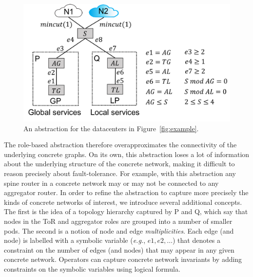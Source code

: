 \documentclass[numbers, 10pt, preprint]{sigplanconf}
\newcommand{\EG}{\emph{e.g.}}
\begin{document}
\begin{figure}[t!]
  \centering
  \includegraphics[width=\columnwidth]{figures/example3}
  \caption{An abstraction for the datacenters in Figure~\ref{fig:example}.}
  \label{fig:example3}
  \vspace{-1em}
\end{figure}

The role-based abstraction therefore overapproximates the connectivity of the underlying concrete graphs. On its own, this abstraction loses a lot of information about the underlying structure of the concrete network, making it difficult to reason precisely about fault-tolerance.
For example, with this abstraction any spine router in a concrete network may or may not be connected to any aggregator router.
%
In order to refine the abstraction to capture more precisely the kinds of concrete networks of interest,
we introduce several additional concepts. The first is the idea of a topology hierarchy captured by P and Q, which say that nodes in the ToR and aggregator roles are grouped into a number of smaller pods.
The second is a notion of node and edge \emph{multiplicities}. Each edge (and node) is labelled
with a symbolic variable (\EG, $e1, e2, \ldots$) that denotes a constraint on the number of edges (and nodes) that may appear in any given concrete network. Operators can capture concrete network invariants by adding constraints on the symbolic variables using logical formula.
\end{document}
